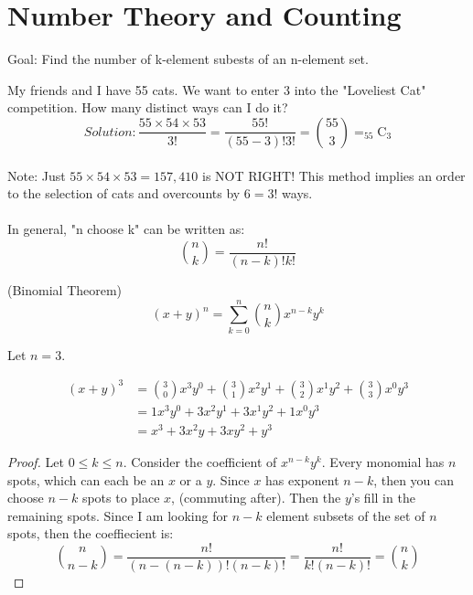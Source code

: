 \section{Number Theory and Counting}

Goal: Find the number of k-element subests of an n-element set.

\begin{example} My friends and I have 55 cats. We want to enter 3 into the "Loveliest Cat" competition. How many distinct ways can I do it? \\

$$Solution: \frac{55 \times 54 \times 53}{3!} = \frac{55!}{(55-3)!3!} = \binom{55}{3} = _{55}\mathrm{C}_{3}$$\\


Note: Just $55 \times 54 \times 53 = 157,410$ is NOT RIGHT! This method implies an order to the selection of cats and overcounts by $6 = 3!$ ways.\\ \\
In general, "n choose k" can be written as: $$ \binom{n}{k} = \frac{n!}{(n-k)!k!}$$
\end{example}

\begin{theorem} (Binomial Theorem)\\
$$ (x + y)^{n} = \sum_
{k=0}^{n}
{\binom{n}{k}} x^{n-k} y^{k}
$$\end{theorem}

\begin{example}
Let $n=3$.

\begin{align*}
(x + y)^3 &= \binom{3}{0}x^{3}y^{0} + \binom{3}{1}x^{2}y^{1} + \binom{3}{2}x^{1}y^{2} + \binom{3}{3}x^{0}y^{3}\\
&= 1x^{3}y^{0} + 3x^{2}y^{1} + 3x^{1}y^{2} + 1x^{0}y^{3}\\ 
&= x^{3} + 3x^{2}y + 3xy^{2} + y^{3}
\end{align*}
\end{example}


\begin{proof}
Let ${0}\leq{k}\leq{n}$. Consider the coefficient of $x^{n-k}y^{k}$. Every monomial has $n$ spots, which can each be an $x$ or a $y$. Since $x$ has exponent $n-k$, then you can choose $n-k$ spots to place $x$, (commuting after). Then the $y$'s fill in the remaining spots. Since I am looking for $n-k$ element subsets of the set of $n$ spots, then the coeffiecient is: 
$$\binom{n}{n-k} = \frac{n!}{(n-(n-k))!(n-k)!} = \frac{n!}{k!(n-k)!} = \binom{n}{k}$$
\end{proof}

